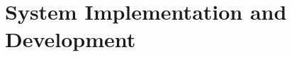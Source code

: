 \documentclass[12pt,letterpaper]{article}
\begin{document}
\setcounter{section}{4}
\section{System Implementation and Development}
\setcounter{subsection}{1}

\end{document}
